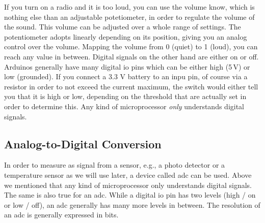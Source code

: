 If you turn on a radio and it is too loud, you can use the volume know, which is nothing else than an adjustable potetiometer, in order to regulate the volume of the sound. This volume can be adjusted over a whole range of settings. The potentiometer adopts linearly depending on its position, giving you an analog control over the volume. Mapping the volume from 0 (quiet) to 1 (loud), you can reach any value in between. Digital signals on the other hand are either on or off. Arduinos generally have many digital \ac{io} pins which can be either high (5\,V) or low (grounded). If you connect a 3.3 V battery to an inpu pin, of course via a resistor in order to not exceed the current maximum, the switch would either tell you that it is high or low, depending on the threshold that are actually set in order to determine this. Any kind of microprocessor \textit{only} understands digital signals. 

\subsection{Analog-to-Digital Conversion}
In order to measure as signal from a sensor, e.g., a photo detector or a temperature sensor as we will use later, a device called \ac{adc} can be used. Above we mentioned that any kind of microprocessor only understands digital signals. The same is also true for an \ac{adc}. While a digital \ac{io} pin has two levels (high / on or low / off), an \ac{adc} generally has many more levels in between. The resolution of an \ac{adc} is generally expressed in bits.


